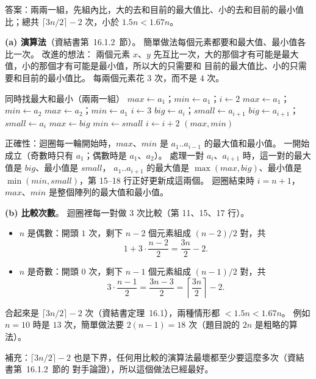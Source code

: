 \begin{pastsoln}
答案：兩兩一組，先組內比，大的去和目前的最大值比、小的去和目前的最小值比；總共
$\lceil 3n/2 \rceil - 2$ 次，小於 $1.5n < 1.67n$。

\textbf{(a) 演算法}（資結書第~16.1.2~節）。 簡單做法每個元素都要和最大值、最小值各比一次。 改進的想法：
兩個元素 $x$、$y$ 先互比一次，大的那個才有可能是最大值，小的那個才有可能是最小值，所以大的只需要和
目前的最大值比、小的只需要和目前的最小值比。 每兩個元素花 $3$ 次，而不是 $4$ 次。

\begin{pseudo}{同時找最大和最小（兩兩一組）}
        \State $\mathit{max} \gets a_1$；$\mathit{min} \gets a_1$；$i \gets 2$
    \Else
         
            \State $\mathit{max} \gets a_1$；$\mathit{min} \gets a_2$
        \Else
            \State $\mathit{max} \gets a_2$；$\mathit{min} \gets a_1$
        \EndIf
        \State $i \gets 3$
    \EndIf
     
            \State $\mathit{big} \gets a_i$；$\mathit{small} \gets a_{i+1}$
        \Else
            \State $\mathit{big} \gets a_{i+1}$；$\mathit{small} \gets a_i$
        \EndIf
            \State $\mathit{max} \gets \mathit{big}$
        \EndIf
            \State $\mathit{min} \gets \mathit{small}$
        \EndIf
        \State $i \gets i + 2$
    \EndWhile
    \State \Return $(\mathit{max}, \mathit{min})$
\EndFunction
\end{pseudo}

正確性：迴圈每一輪開始時，$\mathit{max}$、$\mathit{min}$ 是 $a_1..a_{i-1}$ 的最大值和最小值。 一開始成立（奇數時只有
$a_1$；偶數時是 $a_1$、$a_2$）。 處理一對 $a_i$、$a_{i+1}$ 時，這一對的最大值是 $\mathit{big}$、最小值是 $\mathit{small}$，
$a_1..a_{i+1}$ 的最大值是 $\max(\mathit{max}, \mathit{big})$、最小值是 $\min(\mathit{min}, \mathit{small})$，第 15--18 行正好更新成這兩個。
迴圈結束時 $i = n + 1$，$\mathit{max}$、$\mathit{min}$ 是整個陣列的最大值和最小值。

\textbf{(b) 比較次數}。 迴圈裡每一對做 $3$ 次比較（第 11、15、17 行）。
\begin{itemize}
\item $n$ 是偶數：開頭 $1$ 次，剩下 $n - 2$ 個元素組成 $(n - 2)/2$ 對，共
\[
1 + 3 \cdot \frac{n - 2}{2} = \frac{3n}{2} - 2 .
\]
\item $n$ 是奇數：開頭 $0$ 次，剩下 $n - 1$ 個元素組成 $(n - 1)/2$ 對，共
\[
3 \cdot \frac{n - 1}{2} = \frac{3n - 3}{2} = \left\lceil \frac{3n}{2} \right\rceil - 2 .
\]
\end{itemize}
合起來是 $\lceil 3n/2 \rceil - 2$ 次（資結書定理~16.1），兩種情形都 $< 1.5n < 1.67n$。 例如
$n = 10$ 時是 $13$ 次，簡單做法要 $2(n - 1) = 18$ 次（題目說的 $2n$ 是粗略的算法）。

補充：$\lceil 3n/2 \rceil - 2$ 也是下界，任何用比較的演算法最壞都至少要這麼多次（資結書第~16.1.2~節的
對手論證），所以這個做法已經最好。
\end{pastsoln}
